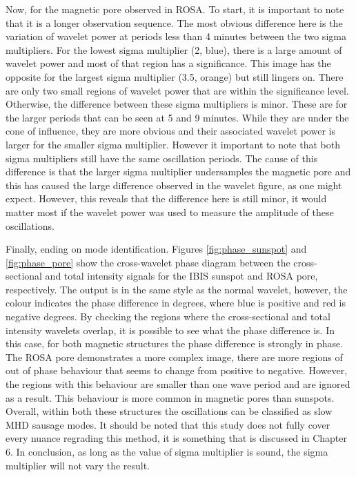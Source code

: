     Now, for the magnetic pore observed in ROSA.
    To start, it is important to note that it is a longer observation sequence.
    The most obvious difference here is the variation of wavelet power at periods less than 4 minutes between the two sigma multipliers. 
    For the lowest sigma multiplier (2, blue), there is a large amount of wavelet power and most of that region has a significance. 
    This image has the opposite for the largest sigma multiplier (3.5, orange) but still lingers on.
    There are only two small regions of wavelet power that are within the significance level.
    Otherwise, the difference between these sigma multipliers is minor.
    These are for the larger periods that can be seen at 5 and 9 minutes.
    While they are under the cone of influence, they are more obvious and their associated wavelet power is larger for the smaller sigma multiplier.
    However it important to note that both sigma multipliers still have the same oscillation periods.
    The cause of this difference is that the larger sigma multiplier undersamples the magnetic pore and this has caused the large difference observed in the wavelet figure, as one might expect.
    However, this reveals that the difference here is still minor, it would matter most if the wavelet power was used to measure the amplitude of these oscillations.

	Finally, ending on mode identification.
	Figures \ref{fig:phase_sunspot} and \ref{fig:phase_pore} show the cross-wavelet phase diagram between the cross-sectional and total intensity signals for the IBIS sunspot and ROSA pore, respectively.
	The output is in the same style as the normal wavelet, however, the colour indicates the phase difference in degrees, where blue is positive and red is negative degrees.
	By checking the regions where the cross-sectional and total intensity wavelets overlap, it is possible to see what the phase difference is.
	In this case, for both magnetic structures the phase difference is strongly in phase. 
	The ROSA pore demonstrates a more complex image, there are more regions of out of phase behaviour that seems to change from positive to negative.
	However, the regions with this behaviour are smaller than one wave period and are ignored as a result.    
	This behaviour is more common in magnetic pores than sunspots.
	Overall, within both these structures the oscillations can be classified as slow MHD sausage modes. 
	It should be noted that this study does not fully cover every nuance regrading this method, it is something that is discussed in Chapter 6.   
	In conclusion, as long as the value of sigma multiplier is sound, the sigma multiplier will not vary the result.
	    
